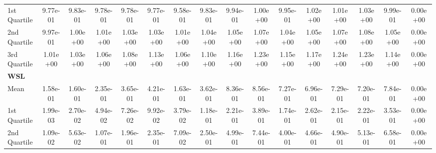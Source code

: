 {\begin{tabular} {lccccccccccccccc}
\hspace{7pt}1st Quartile & 9.77e-01 & 9.83e-01 & 9.78e-01 & 9.78e-01 & 9.77e-01 & 9.58e-01 & 9.83e-01 & 9.94e-01 & 1.00e+00 & 9.95e-01 & 1.02e+00 & 1.01e+00 & 1.03e+00 & 9.99e-01 & \cellcolor{gold!60}0.00e+00 \\ 
\hspace{7pt}2nd Quartile & 9.97e-01 & 1.00e+00 & 1.01e+00 & 1.03e+00 & 1.03e+00 & 1.01e+00 & 1.04e+00 & 1.05e+00 & 1.07e+00 & 1.04e+00 & 1.05e+00 & 1.07e+00 & 1.08e+00 & 1.05e+00 & \cellcolor{gold!60}0.00e+00 \\ 
\hspace{7pt}3rd Quartile & 1.01e+00 & 1.03e+00 & 1.06e+00 & 1.08e+00 & 1.13e+00 & 1.06e+00 & 1.10e+00 & 1.16e+00 & 1.23e+00 & 1.15e+00 & 1.17e+00 & 1.24e+00 & 1.23e+00 & 1.14e+00 & \cellcolor{gold!60}0.00e+00 \\ 
\addlinespace[1ex] 
\textbf{WSL} &  &  &  &  &  &  &  &  &  &  &  &  &  &  &  \\ 
\hspace{7pt}Mean & \cellcolor{bronze!60}1.58e-01 & \cellcolor{bronze!60}1.60e-01 & \cellcolor{bronze!60}2.35e-01 & \cellcolor{bronze!60}3.65e-01 & \cellcolor{bronze!60}4.21e-01 & \cellcolor{bronze!60}1.63e-01 & \cellcolor{bronze!60}3.62e-01 & \cellcolor{bronze!60}8.36e-01 & \cellcolor{bronze!60}8.56e-01 & \cellcolor{bronze!60}7.27e-01 & \cellcolor{bronze!60}6.96e-01 & \cellcolor{bronze!60}7.29e-01 & \cellcolor{bronze!60}7.20e-01 & \cellcolor{bronze!60}7.84e-01 & \cellcolor{gold!60}0.00e+00 \\ 
\hspace{7pt}1st Quartile & \cellcolor{bronze!60}1.99e-03 & \cellcolor{bronze!60}2.70e-02 & \cellcolor{bronze!60}4.94e-02 & \cellcolor{bronze!60}7.26e-02 & \cellcolor{bronze!60}9.92e-02 & \cellcolor{bronze!60}3.79e-02 & \cellcolor{bronze!60}1.18e-01 & \cellcolor{bronze!60}2.21e-01 & \cellcolor{bronze!60}3.89e-01 & \cellcolor{bronze!60}1.74e-01 & \cellcolor{bronze!60}2.62e-01 & \cellcolor{bronze!60}2.15e-01 & \cellcolor{bronze!60}2.22e-01 & \cellcolor{bronze!60}3.53e-01 & \cellcolor{gold!60}0.00e+00 \\ 
\hspace{7pt}2nd Quartile & \cellcolor{bronze!60}1.09e-02 & \cellcolor{bronze!60}5.63e-02 & \cellcolor{bronze!60}1.07e-01 & \cellcolor{bronze!60}1.96e-01 & \cellcolor{bronze!60}2.35e-01 & \cellcolor{bronze!60}7.09e-02 & \cellcolor{bronze!60}2.50e-01 & \cellcolor{bronze!60}4.99e-01 & \cellcolor{bronze!60}7.44e-01 & \cellcolor{bronze!60}4.00e-01 & \cellcolor{bronze!60}4.66e-01 & \cellcolor{bronze!60}4.90e-01 & \cellcolor{bronze!60}5.13e-01 & \cellcolor{bronze!60}6.58e-01 & \cellcolor{gold!60}0.00e+00 \\ 

\end{tabular}}
